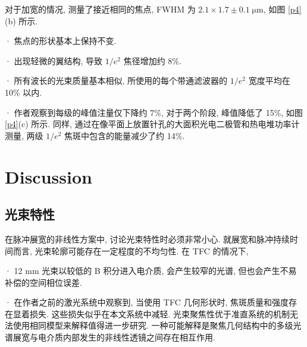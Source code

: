 \documentclass[14pt,a4paper,oneside]{article}
\begin{document}
对于加宽的情况, 测量了接近相同的焦点, FWHM 为 $2.1 \times  1.7 \pm 0.1\; \mathrm{\mu m}$, 如图 \ref{p4} (b) 所示. 

· 焦点的形状基本上保持不变. 

· 出现轻微的翼结构, 导致 $1/e^2$ 焦径增加约 8\%. 

· 所有波长的光束质量基本相似, 所使用的每个带通滤波器的 $1/e^2$ 宽度平均在 10\% 以内. 

· 作者观察到每级的峰值注量仅下降约 7\%, 对于两个阶段, 峰值降低了 15\%, 如图 \ref{p4}(c) 所示. 同样, 通过在像平面上放置针孔的大面积光电二极管和热电堆功率计测量, 两级 $1/e^2$ 焦斑中包含的能量减少了约 14\%. 

\section{Discussion}

\subsection{光束特性}

在脉冲展宽的非线性方案中, 讨论光束特性时必须非常小心. 就展宽和脉冲持续时间而言, 光束轮廓可能存在一定程度的不均匀性. 在 TFC 的情况下, 

· 12 mm 光束以较低的 B 积分进入电介质, 会产生较窄的光谱, 但也会产生不易补偿的空间相位误差. 

· 在作者之前的激光系统中观察到, 当使用 TFC 几何形状时, 焦斑质量和强度存在显着损失\cite{khazanovNonlinearCompressionHighpower2019, farinellaDemonstrationThinFilm2019}. 这些损失似乎在本文系统中减轻. 光束聚焦性优于准直系统的机制无法使用相同模型来解释值得进一步研究. 一种可能解释是聚焦几何结构中的多级光谱展宽与电介质内部发生的非线性透镜之间存在相互作用. 


\newpage

\clearpage           %
{}      %
{}   %


\end{document}
